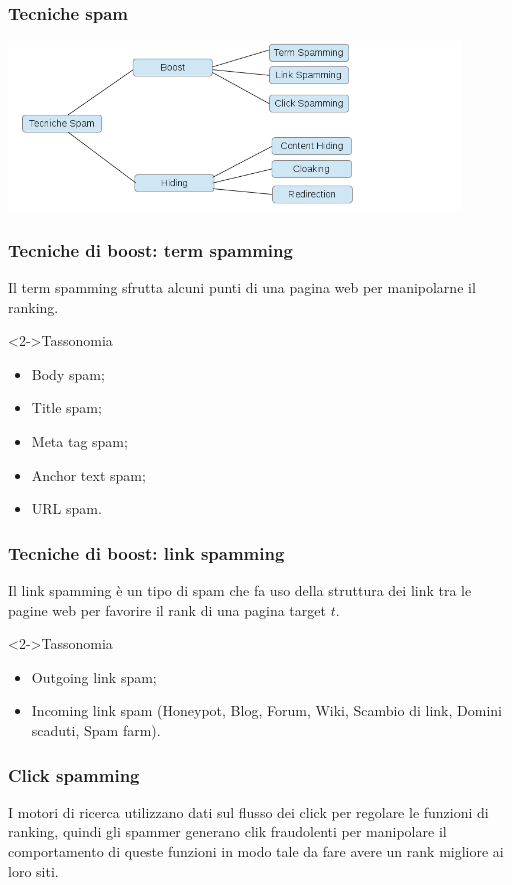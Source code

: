 \documentclass{beamer}
\begin{document}
\begin{frame}
    \frametitle{Tecniche spam}
    \begin{center}
     \includegraphics[width=12cm]{immagini/spam}
    \end{center}
\end{frame}
\begin{frame}
    \frametitle{Tecniche di boost: term spamming}
    Il term spamming sfrutta alcuni punti di una pagina web per manipolarne il ranking.
    \begin{block}<2->{Tassonomia}
    \begin{itemize}
    \item<2->Body spam;
    \item<2->Title spam;
    \item<2->Meta tag spam;
    \item<2->Anchor text spam;
    \item<2->URL spam.
    \end{itemize}
    \end{block}
\end{frame}
\begin{frame}
    \frametitle{Tecniche di boost: link spamming}
    Il link spamming è un tipo di spam che fa uso della struttura dei link tra le pagine web per favorire il rank di una pagina target \(t\). 
    \begin{block}<2->{Tassonomia}
    \begin{itemize}
    \item<2->Outgoing link spam;
    \item<2->Incoming link spam (Honeypot, Blog, Forum, Wiki, Scambio di link, Domini scaduti, Spam farm).
    \end{itemize}
    \end{block}
\end{frame}
\begin{frame}
    \frametitle{Click spamming}
I motori di ricerca utilizzano dati sul flusso dei click per regolare le funzioni di ranking, quindi gli spammer generano clik fraudolenti per manipolare il comportamento di queste funzioni in modo tale da fare avere un rank migliore ai loro siti. 
\end{frame}
\end{document}
